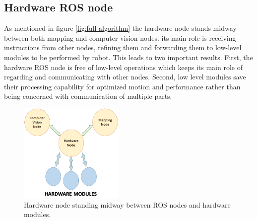 \documentclass[12pt]{article}
\begin{document}
\subsection{Hardware ROS node}
As mentioned in figure \ref{fig:full-algorithm} the hardware node stands midway between both mapping and computer vision nodes. its main role is receiving instructions from other nodes, refining them and forwarding them to low-level modules to be performed by robot. This leads to two important results. First, the hardware ROS node is free of low-level operations which keeps its main role of regarding and communicating with other nodes. Second, low level modules save their processing capability for optimized motion and performance rather than being concerned with communication of multiple parts. 
\begin{figure}[H]
	\centering
	\includegraphics[width =0.45\textwidth]{Fig/hw-node.png}
	\caption{Hardware node standing midway between ROS nodes and hardware modules.}
	\label{fig:hw-node}
\end{figure}

\newpage
\end{document}
